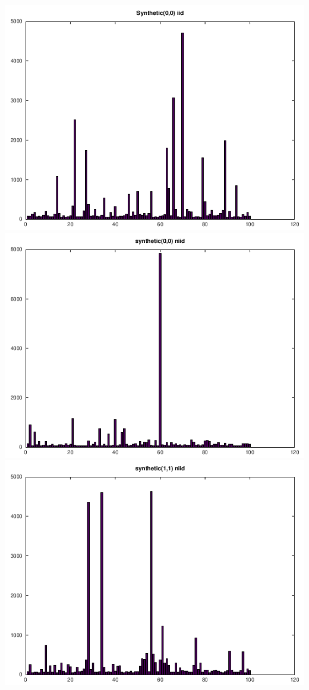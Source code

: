 \documentclass{article}
\theoremstyle{theorem}
\theoremstyle{definition}
\begin{document}
			\includegraphics[scale=0.15]{sy00iid.png}
			\includegraphics[scale=0.15]{sy00niid.png}
			\includegraphics[scale=0.15]{sy11.png}
\end{document}
